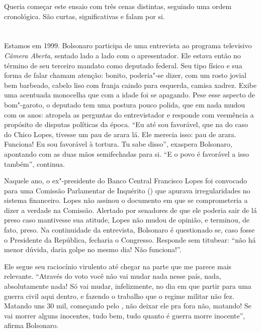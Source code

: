 \noindent{}Queria começar este ensaio com três cenas distintas, seguindo uma ordem
cronológica. São curtas, significativas e falam por si.

\section*{}

Estamos em 1999. Bolsonaro participa de uma entrevista ao programa
televisivo \emph{Câmera Aberta}, sentado lado a lado com o apresentador. Ele
estava então no término de seu terceiro mandato como deputado federal.
Seu tipo físico e sua forma de falar chamam atenção: bonito, poderia"-se
dizer, com um rosto jovial bem barbeado, cabelo liso com franja caindo
para esquerda, camisa xadrez. Exibe uma acentuada monocelha que com a
idade foi se apagando. Pese esse aspecto de bom"-garoto, o deputado tem
uma postura pouco polida, que em nada mudou com os anos: atropela as
perguntas do entrevistador e responde com veemência a propósito de
disputas políticas da época. ``Eu até sou favorável, que na  do caso
do Chico Lopes, tivesse um pau de arara lá. Ele merecia isso: pau de
arara. Funciona! Eu sou favorável à tortura. Tu sabe disso'', exaspera
Bolsonaro, apontando com as duas mãos semifechadas para si. ``E o povo
é favorável a isso também'', continua.

Naquele ano, o ex"-presidente do Banco Central Francisco Lopes foi
convocado para uma Comissão Parlamentar de Inquérito () que apurava
irregularidades no sistema financeiro. Lopes não assinou o documento em
que se comprometeria a dizer a verdade na Comissão. Alertado por
senadores de que ele poderia sair de lá preso caso mantivesse sua
atitude, Lopes não mudou de opinião, e terminou, de fato, preso. Na
continuidade da entrevista, Bolsonaro é questionado se, caso fosse o
Presidente da República, fecharia o Congresso. Responde sem titubear:
``não há menor dúvida, daria golpe no mesmo dia! Não funciona!''.

Ele segue seu raciocínio virulento até chegar na parte que me parece
mais relevante. ``Através do voto você não vai mudar nada nesse país,
nada, absolutamente nada! Só vai mudar, infelizmente, no dia em que
partir para uma guerra civil aqui dentro, e fazendo o trabalho que o
regime militar não fez. Matando uns 30 mil, começando pelo , não
deixar ele pra fora não, matando! Se vai morrer alguns inocentes, tudo
bem, tudo quanto é guerra morre inocente'', afirma Bolsonaro.

